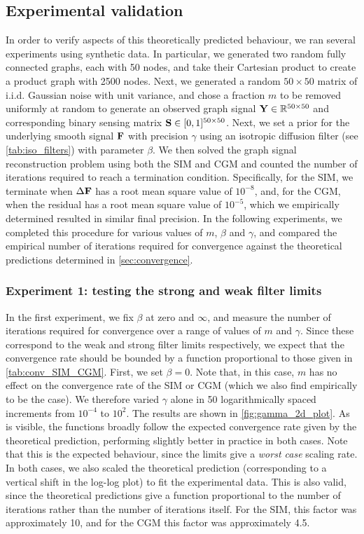 \subsection{Experimental validation}

In order to verify aspects of this theoretically predicted behaviour, we ran several experiments using synthetic data. In particular, we generated two random fully connected graphs, each with 50 nodes, and take their Cartesian product to create a product graph with 2500 nodes. Next, we generated a random $50 \times 50$ matrix of i.i.d. Gaussian noise with unit variance, and chose a fraction $m$ to be removed uniformly at random to generate an observed graph signal $\mathbf{Y} \in \mathbb{R}^{50 \times 50}$ and corresponding binary sensing matrix $\mathbf{S} \in [0, 1]^{50 \times 50}$. Next, we set a prior for the underlying smooth signal $\mathbf{F}$ with precision $\gamma$ using an isotropic diffusion filter (see \cref{tab:iso_filters}) with parameter $\beta$. We then solved the graph signal reconstruction problem using both the SIM and CGM and counted the number of iterations required to reach a termination condition. Specifically, for the SIM, we terminate when $\Delta\mathbf{F}$ has a root mean square value of $10^{-8}$, and, for the CGM, when the residual has a root mean square value of $10^{-5}$, which we empirically determined resulted in similar final precision. In the following experiments, we completed this procedure for various values of $m$, $\beta$ and $\gamma$, and compared the empirical number of iterations required for convergence against the theoretical predictions determined in \cref{sec:convergence}. 
 
\subsubsection{Experiment 1: testing the strong and weak filter limits}

In the first experiment, we fix $\beta$ at zero and $\infty$, and measure the number of iterations required for convergence over a range of values of $m$ and $\gamma$. Since these correspond to the weak and strong filter limits respectively, we expect that the convergence rate should be bounded by a function proportional to those given in \cref{tab:conv_SIM_CGM}. First, we set $\beta=0$. Note that, in this case, $m$ has no effect on the convergence rate of the SIM or CGM (which we also find empirically to be the case). We therefore varied $\gamma$ alone in 50 logarithmically spaced increments from $10^{-4}$ to $10^2$. The results are shown in \cref{fig:gamma_2d_plot}. As is visible, the functions broadly follow the expected convergence rate given by the theoretical prediction, performing slightly better in practice in both cases. Note that this is the expected behaviour, since the limits give a \textit{worst case} scaling rate. In both cases, we also scaled the theoretical prediction (corresponding to a vertical shift in the log-log plot) to fit the experimental data. This is also valid, since the theoretical predictions give a function proportional to the number of iterations rather than the number of iterations itself. For the SIM, this factor was approximately 10, and for the CGM this factor was approximately 4.5. 
 


